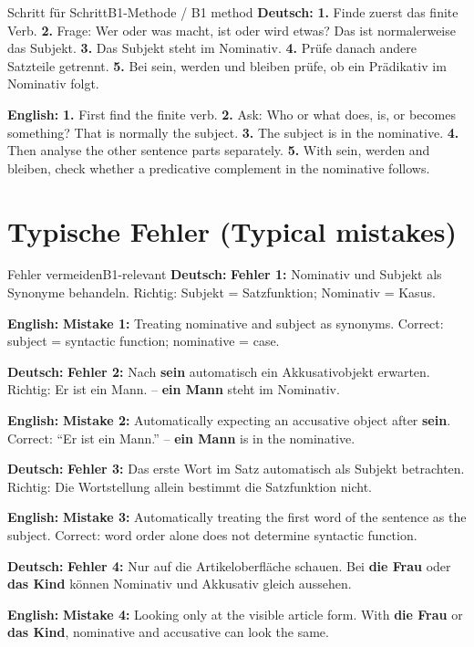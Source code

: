 \documentclass[a4paper,11pt]{article}
\newcommand{\GermanText}[1]{\textbf{Deutsch: }#1\par}
\newcommand{\EnglishText}[1]{{\small\color{SoftGray}\textbf{English: }#1\par}}
\begin{document}
\begin{grammarentry}{Schritt für Schritt}{B1-Methode / B1 method}
\GermanText{\textbf{1.} Finde zuerst das finite Verb. \textbf{2.} Frage: Wer oder was macht, ist oder wird etwas? Das ist normalerweise das Subjekt. \textbf{3.} Das Subjekt steht im Nominativ. \textbf{4.} Prüfe danach andere Satzteile getrennt. \textbf{5.} Bei sein, werden und bleiben prüfe, ob ein Prädikativ im Nominativ folgt.}
\EnglishText{\textbf{1.} First find the finite verb. \textbf{2.} Ask: Who or what does, is, or becomes something? That is normally the subject. \textbf{3.} The subject is in the nominative. \textbf{4.} Then analyse the other sentence parts separately. \textbf{5.} With sein, werden and bleiben, check whether a predicative complement in the nominative follows.}
\end{grammarentry}

\section{Typische Fehler \textnormal{(Typical mistakes)}}

\begin{grammarentry}{Fehler vermeiden}{B1-relevant}
\GermanText{\textbf{Fehler 1:} Nominativ und Subjekt als Synonyme behandeln. Richtig: Subjekt = Satzfunktion; Nominativ = Kasus.}
\EnglishText{\textbf{Mistake 1:} Treating nominative and subject as synonyms. Correct: subject = syntactic function; nominative = case.}

\GermanText{\textbf{Fehler 2:} Nach \textbf{sein} automatisch ein Akkusativobjekt erwarten. Richtig: \glqq Er ist ein Mann.\grqq{} -- \textbf{ein Mann} steht im Nominativ.}
\EnglishText{\textbf{Mistake 2:} Automatically expecting an accusative object after \textbf{sein}. Correct: ``Er ist ein Mann.'' -- \textbf{ein Mann} is in the nominative.}

\GermanText{\textbf{Fehler 3:} Das erste Wort im Satz automatisch als Subjekt betrachten. Richtig: Die Wortstellung allein bestimmt die Satzfunktion nicht.}
\EnglishText{\textbf{Mistake 3:} Automatically treating the first word of the sentence as the subject. Correct: word order alone does not determine syntactic function.}

\GermanText{\textbf{Fehler 4:} Nur auf die Artikeloberfläche schauen. Bei \textbf{die Frau} oder \textbf{das Kind} können Nominativ und Akkusativ gleich aussehen.}
\EnglishText{\textbf{Mistake 4:} Looking only at the visible article form. With \textbf{die Frau} or \textbf{das Kind}, nominative and accusative can look the same.}
\end{grammarentry}
\end{document}
